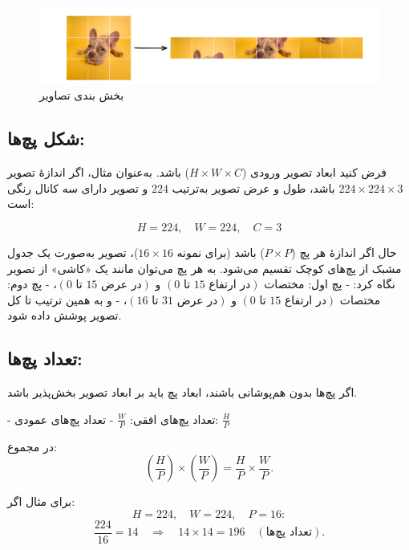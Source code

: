 \begin{figure}[h]
	\centering
	\begin{minipage}[b]{0.9\textwidth}
		\centering
		\includegraphics[width=\textwidth]{transformer_images/image_patch_embedding.png}
		\caption{بخش بندی تصاویر}
		\label{fig:image to patch in vision transformer}
	\end{minipage}
	\hfill
\end{figure}

\subsection{شکل پچ‌ها:}
فرض کنید ابعاد تصویر ورودی (\(H \times W \times C\)) باشد. به‌عنوان مثال، اگر اندازهٔ تصویر \(224 \times 224 \times 3\) باشد، طول و عرض تصویر به‌ترتیب \(224\) و تصویر دارای سه کانال رنگی است:

\[
H = 224, \quad W = 224, \quad C = 3
\]


حال اگر اندازهٔ هر پچ (\(P \times P\)) باشد (برای نمونه \(16 \times 16\))، تصویر به‌صورت یک جدول مشبک از پچ‌های کوچک تقسیم می‌شود.  
به هر پچ می‌توان مانند یک «کاشی» از تصویر نگاه کرد:
- پچ اول: مختصات \((0 \text{ تا } 15 \text{ در ارتفاع}) \) و \((0 \text{ تا } 15 \text{ در عرض})\)،  
- پچ دوم: مختصات \((0 \text{ تا } 15 \text{ در ارتفاع}) \) و \((16 \text{ تا } 31 \text{ در عرض})\)،  
- و به همین ترتیب تا کل تصویر پوشش داده شود.



\subsection{تعداد پچ‌ها:}
اگر پچ‌ها بدون هم‌پوشانی باشند، ابعاد پچ باید بر ابعاد تصویر بخش‌پذیر باشد.  

- تعداد پچ‌های افقی: \(\frac{W}{P}\)  
- تعداد پچ‌های عمودی: \(\frac{H}{P}\)  

در مجموع:  
\begin{equation}
	\left(\frac{H}{P}\right) \times \left(\frac{W}{P}\right) = \frac{H}{P} \times \frac{W}{P}.
	\label{eq:grid_size}
\end{equation}


برای مثال اگر:
\[
H = 224, \quad W = 224, \quad P = 16:
\]
\[
\frac{224}{16} = 14 \quad \Rightarrow \quad 14 \times 14 = 196 \quad (\text{تعداد پچ‌ها}).
\]


